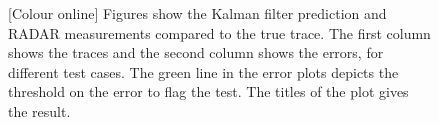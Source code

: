 \documentclass[11pt]{article}
\begin{document}
\begin{figure}[!h]

\caption{[Colour online] Figures show the Kalman filter prediction and RADAR measurements compared to the true trace. The first column shows the traces and the second column shows the errors, for different test cases. The green line in the error plots depicts the threshold on the error to flag the test. The titles of the plot gives the result.}
\label{fig:TraceVelPosTest}
\end{figure}
\end{document}
